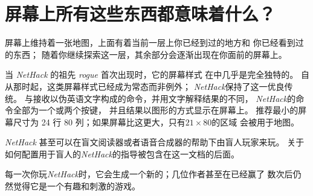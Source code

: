 \documentclass[a4paper, 10pt]{article}
\begin{document}
\section{屏幕上所有这些东西都意味着什么？}
屏幕上维持着一张地图，上面有着当前一层\zhTransDungeon{}上你已经到过的地方和
你已经看到过的东西；
随着你继续探索这一层，其余部分会逐渐出现在你面前的屏幕上。

当 {\it NetHack\/} 的祖先 {\it rogue\/} 首次出现时，它的屏幕样式
在\zhTransComputerFantasyGames{}中几乎是完全独特的。
自从那时起，这类屏幕样式已经成为常态而非例外；
{\it NetHack\/}保持了这一优良传统。
与接收以伪英语文字构成的命令，并用文字解释结果的\zhTransTextAdventureGames{}不同，
{\it NetHack\/}的命令全部为一个或两个按键，
并且结果以图形的方式显示在屏幕上。
推荐最小的屏幕尺寸为 24 行 80 列；如果屏幕比这更大，只有$21\times80$的区域
会被用于地图。

{\it NetHack\/} 甚至可以在盲文阅读器或者语音合成器的帮助下由盲人玩家来玩。
关于如何配置用于盲人的{\it NetHack\/}的指导被包含在这一文档的后面。

每一次你玩{\it NetHack\/}时，它会生成一个新的\zhTransDungeon{}；几位作者甚至在已经赢了
数次后仍然觉得它是一个有趣和刺激的游戏。
\end{document}
